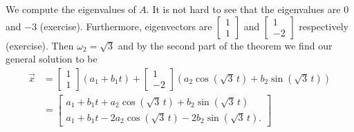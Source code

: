 \documentclass[12pt]{book}
\begin{document}
\begin{example}
We compute the eigenvalues of $A$.  It is not hard to see that the eigenvalues
are 0 and $-3$ (exercise).  Furthermore,
eigenvectors are
$\left[ \begin{smallmatrix} 1 \\ 1 \end{smallmatrix} \right]$ and
$\left[ \begin{smallmatrix} 1 \\ -2 \end{smallmatrix} \right]$ respectively
(exercise). 
Then
$\omega_2 = \sqrt{3}$ and by the second part of the theorem
we find our general solution to be
\begin{equation*}
\begin{split}
\vec{x} & = 
\begin{bmatrix} 1 \\ 1 \end{bmatrix}
\left( a_1 + b_1 t \right) 
+
\begin{bmatrix} 1 \\ -2 \end{bmatrix}
\left( a_2 \cos (\! \sqrt{3} \, t) + b_2 \sin (\! \sqrt{3} \, t ) \right)
\\
& =
\begin{bmatrix}
a_1 + b_1 t + a_2 \cos ( \! \sqrt{3} \, t ) + b_2 \sin ( \! \sqrt{3} \, t
) \\
a_1 + b_1 t - 2 a_2 \cos ( \! \sqrt{3} \, t ) - 2 b_2 \sin ( \! \sqrt{3}
\, t ) .
\end{bmatrix}
\end{split}
\end{equation*}


\end{example}
\end{document}
